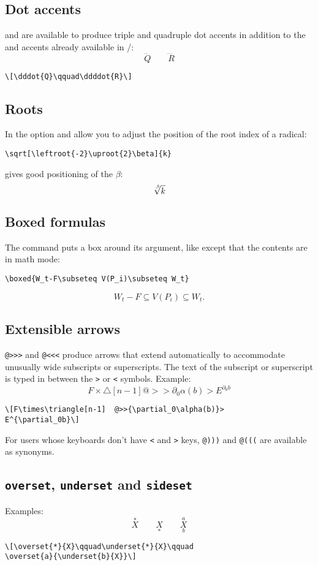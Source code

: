 \subsection{Dot accents}
 and  are available to
produce triple and quadruple dot accents
in addition to the  and  accents already available
in \latex/: 
\[\dddot{Q}\qquad\ddddot{R}\]
\begin{verbatim}
\[\dddot{Q}\qquad\ddddot{R}\]
\end{verbatim}

\subsection{Roots}

In the  option  and  allow you to adjust
the position of the root index of a radical:
\begin{verbatim}
\sqrt[\leftroot{-2}\uproot{2}\beta]{k}
\end{verbatim}
gives good positioning of the $\beta$:
\[\sqrt[\leftroot{-2}\uproot{2}\beta]{k}\]

\subsection{Boxed formulas} The command  puts a box around its
argument, like  except that the contents are in math mode:
\begin{verbatim}
\boxed{W_t-F\subseteq V(P_i)\subseteq W_t}
\end{verbatim}
\[\boxed{W_t-F\subseteq V(P_i)\subseteq W_t}.\]

\subsection{Extensible arrows} \verb"@>>>" and \verb"@<<<" produce
arrows that extend automatically to accommodate unusually wide
subscripts or superscripts.  The text of the subscript or superscript
is typed in between the \verb+>+ or \verb+<+ symbols.
Example:
\[F\times\triangle[n-1]  @>>{\partial_0\alpha(b)}>  
E^{\partial_0b}\]
\begin{verbatim}
\[F\times\triangle[n-1]  @>>{\partial_0\alpha(b)}>  
E^{\partial_0b}\]
\end{verbatim}
For users whose keyboards don't have \verb=<= and \verb=>=
keys, \verb=@)))= and \verb=@(((= are available as synonyms.

\subsection{{\tt\bslash overset}, {\tt\bslash underset} and
{\tt\bslash sideset}} 
Examples:
\[\overset{*}{X}\qquad\underset{*}{X}\qquad
\overset{a}{\underset{b}{X}}\]
\begin{verbatim}
\[\overset{*}{X}\qquad\underset{*}{X}\qquad
\overset{a}{\underset{b}{X}}\]
\end{verbatim}

